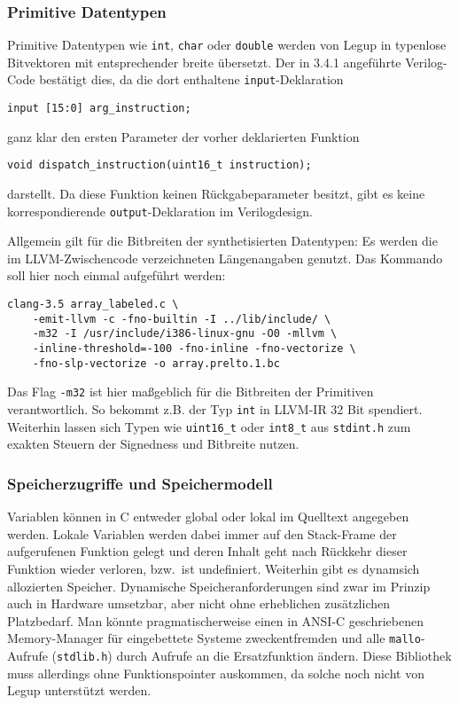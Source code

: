\documentclass[oneside,a4paper]{article}
\def\B#1{\lstinline[style=bash]{#1}}
\def\V#1{\lstinline[style=verilog]{#1}}
\def\C#1{\lstinline[style=c]{#1}}
\begin{document}
\subsubsection{Primitive Datentypen}
Primitive Datentypen wie \C{int}, \C{char} oder \C{double}
werden von Legup in typenlose Bitvektoren mit entsprechender breite übersetzt.
Der in 3.4.1 angeführte Verilog-Code bestätigt dies, da die dort enthaltene
\V{input}-Deklaration

\begin{lstlisting}[style=verilog]
input [15:0] arg_instruction;
\end{lstlisting}

ganz klar den ersten Parameter der vorher deklarierten Funktion
\begin{lstlisting}[style=c]
void dispatch_instruction(uint16_t instruction);
\end{lstlisting}
darstellt. Da diese Funktion keinen Rückgabeparameter besitzt, gibt es keine
korrespondierende \V{output}-Deklaration im Verilogdesign.

Allgemein gilt für die Bitbreiten der synthetisierten Datentypen:
Es werden die im LLVM-Zwischencode verzeichneten Längenangaben genutzt.
Das Kommando soll hier noch einmal aufgeführt werden:
\begin{lstlisting}[style=bash]
clang-3.5 array_labeled.c \
    -emit-llvm -c -fno-builtin -I ../lib/include/ \
    -m32 -I /usr/include/i386-linux-gnu -O0 -mllvm \
    -inline-threshold=-100 -fno-inline -fno-vectorize \
    -fno-slp-vectorize -o array.prelto.1.bc
\end{lstlisting}
Das Flag \B{-m32} ist hier maßgeblich für die Bitbreiten der Primitiven
verantwortlich. So bekommt z.B. der Typ \C{int} in LLVM-IR 32 Bit spendiert.
Weiterhin lassen sich Typen wie \C{uint16_t} oder \C{int8_t} aus
\C{stdint.h} zum exakten Steuern der Signedness und Bitbreite nutzen.

\subsubsection{Speicherzugriffe und Speichermodell}
Variablen können in C entweder global oder lokal im Quelltext angegeben werden.
Lokale Variablen werden dabei immer auf den Stack-Frame der aufgerufenen Funktion
gelegt und deren Inhalt geht nach Rückkehr dieser Funktion wieder verloren, bzw.\
ist undefiniert. Weiterhin gibt es dynamsich allozierten Speicher. Dynamische
Speicheranforderungen sind zwar im Prinzip auch in Hardware umsetzbar, aber nicht
ohne erheblichen zusätzlichen Platzbedarf. Man könnte pragmatischerweise
einen in ANSI-C geschriebenen Memory-Manager für eingebettete Systeme
zweckentfremden und alle \C{mallo}-Aufrufe (\C{stdlib.h}) durch Aufrufe an die
Ersatzfunktion ändern. Diese Bibliothek muss allerdings ohne Funktionspointer
auskommen, da solche noch nicht von Legup unterstützt werden.
\end{document}

